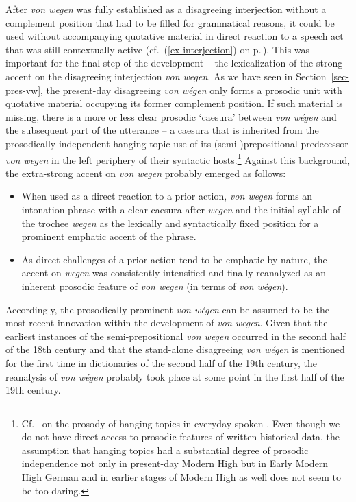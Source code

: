 \documentclass[output=paper
  ,nobabel
  ,draftmode
  ,babelshorthands
  ,colorlinks, citecolor=brown
]{langscibook}
\begin{document}
After \emph{von wegen} was fully established as a disagreeing interjection without a complement position that had to be filled for grammatical reasons, it could be used without accompanying quotative material in direct reaction to a speech act that was still contextually active (cf.\ (\ref{ex-interjection}) on p.\,\pageref{ex-interjection}). This was important for the final step of the development – the lexicalization of the strong accent on the disagreeing interjection \emph{von wegen}. As we have seen in Section~\ref{sec-pres-vw}, the present-day disagreeing \emph{von wégen} only forms a prosodic unit with quotative material occupying its former complement position. If such material is missing, there is a more or less clear prosodic `caesura' \citep{Auer2010,Barth-Weingarten2016}
between \emph{von wégen} and the subsequent part of the utterance -- a caesura that is inherited from the prosodically independent hanging topic use of its (semi-)prepositional predecessor \emph{von wegen} in the left periphery of their syntactic hosts.\footnote{Cf.\ \citet{Selting1993} on the prosody of hanging topics in everyday spoken . Even though we do not have direct access to prosodic features of written historical data, the assumption that hanging topics had a substantial degree of prosodic independence not only in present-day Modern High  but in Early Modern High German and in earlier stages of Modern High  as well does not seem to be too daring.}
Against this background, the extra-strong accent on \emph{von wegen} probably emerged as follows:

\begin{itemize}
    \item When used as a direct reaction to a prior action, \emph{von wegen} forms an intonation phrase with a clear caesura after \emph{wegen} and the initial syllable of the trochee \emph{wegen} as the lexically and syntactically fixed position for a prominent emphatic accent of the phrase.
    
    \item As direct challenges of a prior action tend to be emphatic by nature, the accent on \emph{wegen} was consistently intensified and finally reanalyzed as an inherent prosodic feature of \emph{von wegen} (in terms of \emph{von wégen}).
\end{itemize}

\largerpage
\noindent
Accordingly, the prosodically prominent \emph{von wégen} can be assumed to be the most recent innovation within the development of \emph{von wegen}. Given that the earliest instances of the semi-prepositional \emph{von wegen} occurred in the second half of the 18th century and that the stand-alone disagreeing \emph{von wégen} is mentioned for the first time in dictionaries of the second half of the 19th century, the reanalysis of \emph{von wégen} probably took place at some point in the first half of the 19th century.
\end{document}
